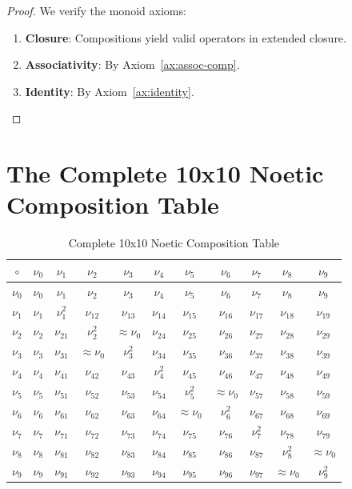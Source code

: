 \documentclass[11pt,twoside,openright]{book}
\theoremstyle{definition}
\theoremstyle{plain}
\theoremstyle{remark}
\newcommand{\noe}[1]{\nu_{#1}}
\begin{document}
\begin{proof}
We verify the monoid axioms:
\begin{enumerate}
  \item \textbf{Closure}: Compositions yield valid operators in extended closure.
  \item \textbf{Associativity}: By Axiom~\ref{ax:assoc-comp}.
  \item \textbf{Identity}: By Axiom~\ref{ax:identity}.
\end{enumerate}
\end{proof}

\section{The Complete 10x10 Noetic Composition Table}

\begin{table}[h]
\centering
\caption{Complete 10x10 Noetic Composition Table}
\label{tab:composition}
\small
\begin{tabular}{c|cccccccccc}
$\circ$ & $\noe{0}$ & $\noe{1}$ & $\noe{2}$ & $\noe{3}$ & $\noe{4}$ & $\noe{5}$ & $\noe{6}$ & $\noe{7}$ & $\noe{8}$ & $\noe{9}$ \\
\hline
$\noe{0}$ & $\noe{0}$ & $\noe{1}$ & $\noe{2}$ & $\noe{3}$ & $\noe{4}$ & $\noe{5}$ & $\noe{6}$ & $\noe{7}$ & $\noe{8}$ & $\noe{9}$ \\
$\noe{1}$ & $\noe{1}$ & $\noe{1}^2$ & $\noe{12}$ & $\noe{13}$ & $\noe{14}$ & $\noe{15}$ & $\noe{16}$ & $\noe{17}$ & $\noe{18}$ & $\noe{19}$ \\
$\noe{2}$ & $\noe{2}$ & $\noe{21}$ & $\noe{2}^2$ & $\approx\noe{0}$ & $\noe{24}$ & $\noe{25}$ & $\noe{26}$ & $\noe{27}$ & $\noe{28}$ & $\noe{29}$ \\
$\noe{3}$ & $\noe{3}$ & $\noe{31}$ & $\approx\noe{0}$ & $\noe{3}^2$ & $\noe{34}$ & $\noe{35}$ & $\noe{36}$ & $\noe{37}$ & $\noe{38}$ & $\noe{39}$ \\
$\noe{4}$ & $\noe{4}$ & $\noe{41}$ & $\noe{42}$ & $\noe{43}$ & $\noe{4}^2$ & $\noe{45}$ & $\noe{46}$ & $\noe{47}$ & $\noe{48}$ & $\noe{49}$ \\
$\noe{5}$ & $\noe{5}$ & $\noe{51}$ & $\noe{52}$ & $\noe{53}$ & $\noe{54}$ & $\noe{5}^2$ & $\approx\noe{0}$ & $\noe{57}$ & $\noe{58}$ & $\noe{59}$ \\
$\noe{6}$ & $\noe{6}$ & $\noe{61}$ & $\noe{62}$ & $\noe{63}$ & $\noe{64}$ & $\approx\noe{0}$ & $\noe{6}^2$ & $\noe{67}$ & $\noe{68}$ & $\noe{69}$ \\
$\noe{7}$ & $\noe{7}$ & $\noe{71}$ & $\noe{72}$ & $\noe{73}$ & $\noe{74}$ & $\noe{75}$ & $\noe{76}$ & $\noe{7}^2$ & $\noe{78}$ & $\noe{79}$ \\
$\noe{8}$ & $\noe{8}$ & $\noe{81}$ & $\noe{82}$ & $\noe{83}$ & $\noe{84}$ & $\noe{85}$ & $\noe{86}$ & $\noe{87}$ & $\noe{8}^2$ & $\approx\noe{0}$ \\
$\noe{9}$ & $\noe{9}$ & $\noe{91}$ & $\noe{92}$ & $\noe{93}$ & $\noe{94}$ & $\noe{95}$ & $\noe{96}$ & $\noe{97}$ & $\approx\noe{0}$ & $\noe{9}^2$ \\
\end{tabular}
\end{table}
\end{document}
